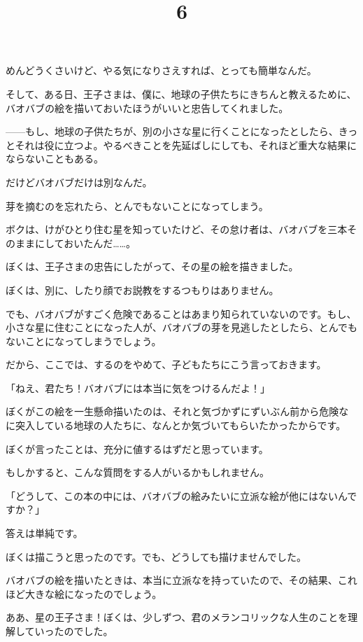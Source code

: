 めんどうくさいけど、やる気になりさえすれば、とっても簡単なんだ。

そして、ある日、王子さまは、僕に、地球の子供たちにきちんと教えるために、バオバブの絵を描いておいたほうがいいと忠告してくれました。


——もし、地球の子供たちが、別の小さな星に行くことになったとしたら、きっとそれは役に立つよ。やるべきことを先延ばしにしても、それほど重大な結果にならないこともある。

だけどバオバブだけは別なんだ。

芽を摘むのを忘れたら、とんでもないことになってしまう。

ボクは、けがひとり住む星を知っていたけど、その怠け者は、バオバブを三本そのままにしておいたんだ……。

ぼくは、王子さまの忠告にしたがって、その星の絵を描きました。

ぼくは、別に、したり顔でお説教をするつもりはありません。

でも、バオバブがすごく危険であることはあまり知られていないのです。もし、小さな星に住むことになった人が、バオバブの芽を見逃したとしたら、とんでもないことになってしまうでしょう。

だから、ここでは、するのをやめて、子どもたちにこう言っておきます。


「ねえ、君たち！バオバブには本当に気をつけるんだよ！」

ぼくがこの絵を一生懸命描いたのは、それと気づかずにずいぶん前から危険なに突入している地球の人たちに、なんとか気づいてもらいたかったからです。

ぼくが言ったことは、充分に値するはずだと思っています。

もしかすると、こんな質問をする人がいるかもしれません。

「どうして、この本の中には、バオバブの絵みたいに立派な絵が他にはないんですか？」

答えは単純です。

ぼくは描こうと思ったのです。でも、どうしても描けませんでした。

バオバブの絵を描いたときは、本当に立派なを持っていたので、その結果、これほど大きな絵になったのでしょう。


\title{6}

ああ、星の王子さま！ぼくは、少しずつ、君のメランコリックな人生のことを理解していったのでした。

